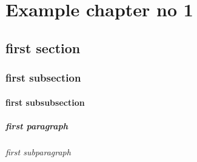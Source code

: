\documentclass{memoir}
\begin{document}
\newpage
\begin{KeepFromToc}
	\tableofcontents 
	\thispagestyle{empty}
\end{KeepFromToc}
\newpage


\chapter{\\ Example chapter no 1}

\section{first section}

\subsection{first subsection}

\subsubsection{first subsubsection}

\paragraph{first paragraph}

\subparagraph{first subparagraph}






%
%
\end{document}
